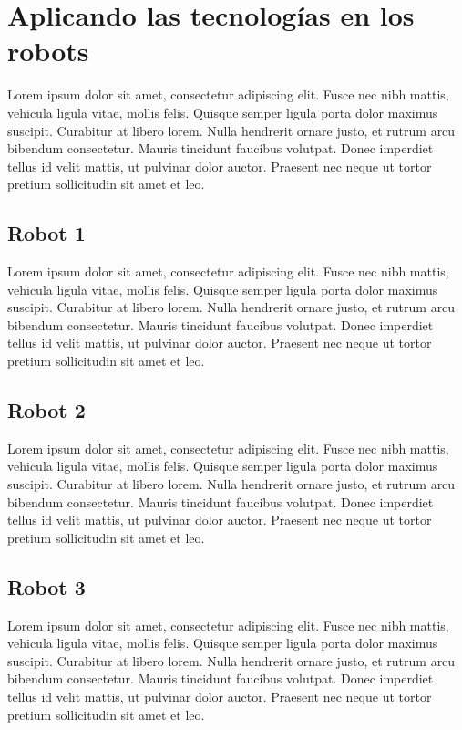 \chapter{Aplicando las tecnologías en los robots}\label{ch:chapter4}

Lorem ipsum dolor sit amet, consectetur adipiscing elit. Fusce nec nibh mattis, vehicula ligula vitae, mollis felis. Quisque semper ligula porta dolor maximus suscipit. Curabitur at libero lorem. Nulla hendrerit ornare justo, et rutrum arcu bibendum consectetur. Mauris tincidunt faucibus volutpat. Donec imperdiet tellus id velit mattis, ut pulvinar dolor auctor. Praesent nec neque ut tortor pretium sollicitudin sit amet et leo.

\section{Robot 1}

Lorem ipsum dolor sit amet, consectetur adipiscing elit. Fusce nec nibh mattis, vehicula ligula vitae, mollis felis. Quisque semper ligula porta dolor maximus suscipit. Curabitur at libero lorem. Nulla hendrerit ornare justo, et rutrum arcu bibendum consectetur. Mauris tincidunt faucibus volutpat. Donec imperdiet tellus id velit mattis, ut pulvinar dolor auctor. Praesent nec neque ut tortor pretium sollicitudin sit amet et leo.

\section{Robot 2}

Lorem ipsum dolor sit amet, consectetur adipiscing elit. Fusce nec nibh mattis, vehicula ligula vitae, mollis felis. Quisque semper ligula porta dolor maximus suscipit. Curabitur at libero lorem. Nulla hendrerit ornare justo, et rutrum arcu bibendum consectetur. Mauris tincidunt faucibus volutpat. Donec imperdiet tellus id velit mattis, ut pulvinar dolor auctor. Praesent nec neque ut tortor pretium sollicitudin sit amet et leo.

\section{Robot 3}

Lorem ipsum dolor sit amet, consectetur adipiscing elit. Fusce nec nibh mattis, vehicula ligula vitae, mollis felis. Quisque semper ligula porta dolor maximus suscipit. Curabitur at libero lorem. Nulla hendrerit ornare justo, et rutrum arcu bibendum consectetur. Mauris tincidunt faucibus volutpat. Donec imperdiet tellus id velit mattis, ut pulvinar dolor auctor. Praesent nec neque ut tortor pretium sollicitudin sit amet et leo.

